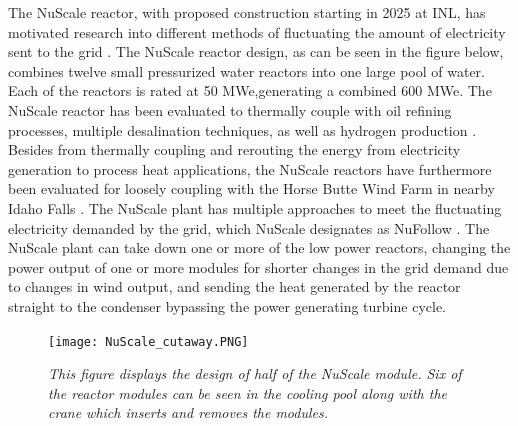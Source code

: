The NuScale reactor, with proposed construction starting in 2025 at INL, has motivated research into different methods of fluctuating the amount of electricity sent to the grid \cite{Ingersoll2014, Ingersoll2015, Ingersoll2016, Ingersoll2014_1}. The NuScale reactor design, as can be seen in the figure below, combines twelve small pressurized water reactors into one large pool of water.  Each of the reactors is rated at 50 MWe,generating a combined 600 MWe. The NuScale reactor has been evaluated to thermally couple with oil refining processes, multiple desalination techniques, as well as hydrogen production \cite{Ingersoll2014}. Besides from thermally coupling and rerouting the energy from electricity generation to process heat applications, the NuScale reactors have furthermore been evaluated for loosely coupling with the Horse Butte Wind Farm in nearby Idaho Falls \cite{Ingersoll2015}.  The NuScale plant has multiple approaches to meet the fluctuating electricity demanded by the grid, which NuScale designates as NuFollow \cite{Ingersoll2015}.  The NuScale plant can take down one or more of the low power reactors, changing the power output of one or more modules for shorter changes in the grid demand due to changes in wind output, and sending the heat generated by the reactor straight to the condenser bypassing the power generating turbine cycle.
\begin{figure}[h!]
\texttt{[image: NuScale\_cutaway.PNG]}
\caption{\small \sl This figure displays the design of half of the NuScale module. Six of the reactor modules can be seen in the cooling pool along with the crane which inserts and removes the modules.}
\end{figure}

